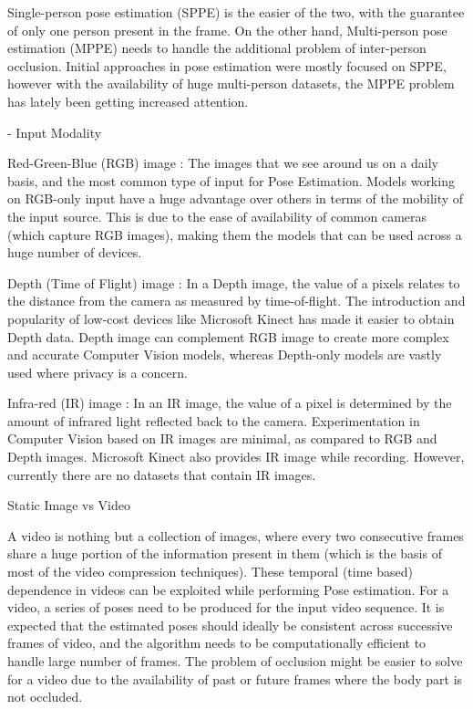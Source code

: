 Single-person pose estimation (SPPE) is the easier of the two, with the guarantee of only one person
present in the frame. On the other hand, Multi-person pose estimation (MPPE) needs to handle the
additional problem of inter-person occlusion. Initial approaches in pose estimation were mostly
focused on SPPE, however with the availability of huge multi-person datasets, the MPPE problem has
lately been getting increased attention.

- Input Modality

Red-Green-Blue (RGB) image : The images that we see around us on a daily basis, and the most common
type of input for Pose Estimation. Models working on RGB-only input have a huge advantage over
others in terms of the mobility of the input source. This is due to the ease of availability of
common cameras (which capture RGB images), making them the models that can be used across a huge
number of devices.

Depth (Time of Flight) image : In a Depth image, the value of a pixels relates to the distance from
the camera as measured by time-of-flight. The introduction and popularity of low-cost devices
like Microsoft Kinect has made it easier to obtain Depth data. Depth image can complement RGB image
to create more complex and accurate Computer Vision models, whereas Depth-only models are vastly
used where privacy is a concern.

Infra-red (IR) image : In an IR image, the value of a pixel is determined by the amount of infrared
light reflected back to the camera. Experimentation in Computer Vision based on IR images are minimal,
as compared to RGB and Depth images. Microsoft Kinect also provides IR image while recording.
However, currently there are no datasets that contain IR images.

Static Image vs Video

A video is nothing but a collection of images, where every two consecutive frames share a huge
portion of the information present in them (which is the basis of most of the video compression
techniques). These temporal (time based) dependence in videos can be exploited while performing
Pose estimation.
For a video, a series of poses need to be produced for the input video sequence. It is expected
that the estimated poses should ideally be consistent across successive frames of video, and the
algorithm needs to be computationally efficient to handle large number of frames. The problem of
occlusion might be easier to solve for a video due to the availability of past or future frames
where the body part is not occluded.

